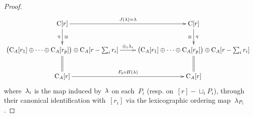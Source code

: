 \begin{proof}
$$\xymatrix{\rmC[r] \ar[r]^{J(\la)=\la} \ar[d]_\eta^\cong& \rmC[r] \ar[d]^\eta_\cong\\
 \big(\rmC_A[r_1]\oplus\dots\oplus \rmC_A[r_p]\big)\oplus \rmC_A[r-\sum_i r_i] \ar@{=}[d] \ar[r]^{\oplus_i \la_i} &\big(\rmC_A[r_1]\oplus\dots\oplus \rmC_A[r_p]\big)\oplus \rmC_A[r-\sum_i r_i] \ar@{=}[d]\\
\rmC_A[r] \ar[r]^{F_0\circ H(\la)} &  \rmC_A[r]
}$$
where~$\lambda_i$ is the map induced by~$\lambda$ on each~$P_i$ (resp. on~$[r]\minus\sqcup_iP_i$), through their canonical identification with~$[r_i]$ via the lexicographic ordering map~$\lambda_{P_i}$. 
\end{proof}






